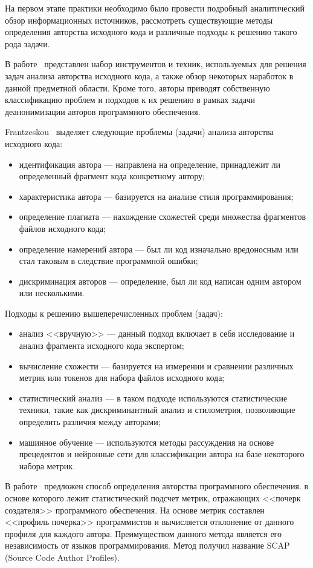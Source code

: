 На первом этапе практики необходимо было провести подробный аналитический обзор информационных источников, 
рассмотреть существующие методы определения авторства исходного кода и различные подходы к решению 
такого рода задачи. 

В работе~\cite{frantz} представлен набор инструментов и техник, используемых для решения задач 
анализа авторства исходного кода, а также обзор некоторых наработок в данной предметной области. 
Кроме того, авторы приводят собственную классификацию проблем и подходов к их решению в рамках 
задачи деанонимизации авторов программного обеспечения. 

Frantzeskou~\cite{frantz} выделяет следующие проблемы (задачи) анализа авторства исходного кода:
\begin{itemize}
  \item идентификация автора --- направлена на определение, принадлежит ли определенный фрагмент кода конкретному автору;
  \item характеристика автора --- базируется на анализе стиля программирования; 
  \item определение плагиата --- нахождение схожестей среди множества фрагментов файлов исходного кода;
  \item определение намерений автора --- был ли код изначально вредоносным или стал таковым в следствие программной ошибки;
  \item дискриминация авторов --- определение, был ли код написан одним автором или несколькими.
\end{itemize}

Подходы к решению вышеперечисленных проблем (задач):
\begin{itemize}
  \item анализ <<вручную>> --- данный подход включает в себя исследование и анализ фрагмента исходного кода экспертом; 
  \item вычисление схожести --- базируется на измерении и сравнении различных метрик или токенов для набора файлов исходного кода;
  \item статистический анализ --- в таком подходе используются статистические техники, такие как дискриминантный анализ и стилометрия, позволяющие определить различия между авторами;
  \item машинное обучение --- используются методы рассуждения на основе прецедентов и нейронные сети для классификации автора на базе некоторого набора метрик.
\end{itemize}

В работе~\cite{frantz_2} предложен способ определения авторства программного обеспечения. в основе которого 
лежит статистический подсчет метрик, отражающих <<почерк создателя>> программного обеспечения. 
На основе метрик составлен <<профиль почерка>> программистов и вычисляется отклонение от данного профиля для 
каждого автора. Преимуществом данного метода является его независимость от языков программирования. Метод 
получил название SCAP (Source Code Author Profiles).

